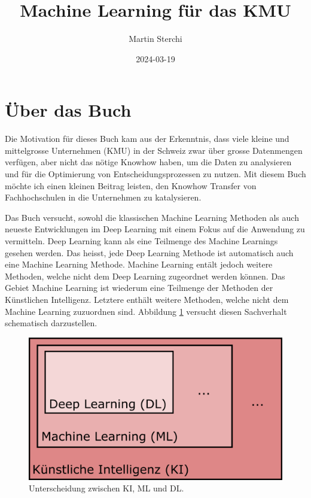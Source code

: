 \documentclass[
]{book}
\title{Machine Learning für das KMU}
\author{Martin Sterchi}
\date{2024-03-19}
\begin{document}
\maketitle

{
\setcounter{tocdepth}{1}
\tableofcontents
}
\hypertarget{uxfcber-das-buch}{%
\chapter*{Über das Buch}\label{uxfcber-das-buch}}

Die Motivation für dieses Buch kam aus der Erkenntnis, dass viele kleine und mittelgrosse Unternehmen (KMU) in der Schweiz zwar über grosse Datenmengen verfügen, aber nicht das nötige Knowhow haben, um die Daten zu analysieren und für die Optimierung von Entscheidungsprozessen zu nutzen. Mit diesem Buch möchte ich einen kleinen Beitrag leisten, den Knowhow Transfer von Fachhochschulen in die Unternehmen zu katalysieren.

Das Buch versucht, sowohl die klassischen Machine Learning Methoden als auch neueste Entwicklungen im Deep Learning mit einem Fokus auf die Anwendung zu vermitteln. Deep Learning kann als eine Teilmenge des Machine Learnings gesehen werden. Das heisst, jede Deep Learning Methode ist automatisch auch eine Machine Learning Methode. Machine Learning entält jedoch weitere Methoden, welche nicht dem Deep Learning zugeordnet werden können. Das Gebiet Machine Learning ist wiederum eine Teilmenge der Methoden der Künstlichen Intelligenz. Letztere enthält weitere Methoden, welche nicht dem Machine Learning zuzuordnen sind. Abbildung \ref{fig:kimldl} versucht diesen Sachverhalt schematisch darzustellen.

\begin{figure}

{\centering \includegraphics[width=0.6\linewidth]{images/KI_ML_DL} 

}

\caption{Unterscheidung zwischen KI, ML und DL. }\label{fig:kimldl}
\end{figure}
\end{document}
